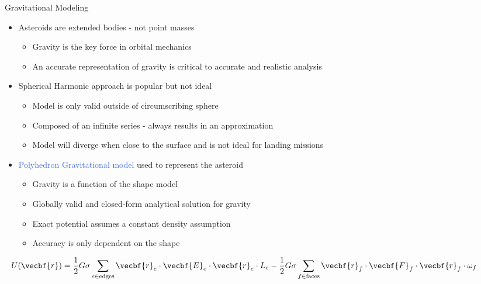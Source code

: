 \documentclass[final, usenames, dvipsnames]{beamer}
\newlength{\onecolwidth}
\newlength{\twocolwidth}
\def\Emph{\textcolor{RoyalBlue}}
\begin{document}
\begin{frame}[t]
\begin{columns}[T]
\begin{column}{\onecolwidth}
\begin{block}{Gravitational Modeling}
	\begin{itemize}
		\item Asteroids are extended bodies - not point masses
		\begin{itemize}
			\item Gravity is the key force in orbital mechanics
			\item An accurate representation of gravity is critical to accurate and realistic analysis
		\end{itemize}
		\item Spherical Harmonic approach is popular but not ideal
		\begin{itemize}
			\item Model is only valid outside of circumscribing sphere
			\item Composed of an infinite series - always results in an approximation
			\item Model will diverge when close to the surface and is not ideal for landing missions
		\end{itemize}
		\item \Emph{Polyhedron Gravitational model} used to represent the asteroid
		\begin{itemize}
			\item Gravity is a function of the shape model
			\item Globally valid and closed-form analytical solution for gravity
			\item Exact potential assumes a constant density assumption
			\item Accuracy is only dependent on the shape
		\end{itemize}
	\end{itemize}
	\[
	U(\vecbf{r}) = \frac{1}{2} G \sigma \sum_{e \in \text{edges}} \vecbf{r}_e \cdot \vecbf{E}_e \cdot \vecbf{r}_e \cdot L_e - \frac{1}{2}G \sigma \sum_{f \in \text{faces}} \vecbf{r}_f \cdot \vecbf{F}_f \cdot \vecbf{r}_f \cdot \omega_f 
	\]	
\end{block} 

\end{column}  %

\begin{column}{\twocolwidth} %


\end{column}
\end{columns}
\end{frame}
\end{document}
